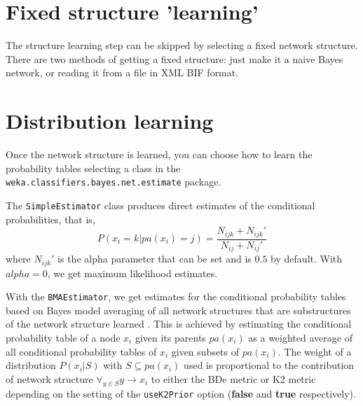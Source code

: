 \section{Fixed structure 'learning'}

The structure learning step can be skipped by selecting a fixed network
structure. There are two methods of getting a fixed structure: just make
it a naive Bayes network, or reading it from a file in XML BIF format.

\begin{center}
\end{center}

\section{Distribution learning\label{sec.estimate}}

Once the network structure is learned, you can choose how to learn the probability
tables selecting a class in the {\tt weka.classifiers.bayes.net.estimate} package.

\begin{center}
\end{center}


The \texttt{SimpleEstimator} class produces direct estimates of the conditional probabilities,
that is, 
$$P(x_i=k|pa(x_i)=j)=\frac{N_{ijk}+N_{ijk}'}{N_{ij}+N_{ij}'}$$ 
where $N_{ijk}'$ is the alpha parameter that can be set and is
$0.5$ by default. With $alpha=0$, we get maximum likelihood estimates.

\begin{center}
\end{center}

With the \texttt{BMAEstimator}, we get estimates for the conditional probability tables based
on Bayes model averaging of all network structures that are substructures of the
network structure learned \cite{bouck1995}. This is achieved by estimating the
conditional probability table of a node $x_i$ given its parents $pa(x_i)$ as a weighted 
average of all conditional probability tables of $x_i$ given subsets of $pa(x_i)$.
The weight of a distribution $P(x_i|S)$ with $S\subseteq pa(x_i)$ used is proportional
to the contribution of network structure $\forall_{y\in S}y\to x_i$ to either the
BDe metric or K2 metric depending on the setting of the {\tt useK2Prior} option (\textbf{false}
and \textbf{true} respectively).


